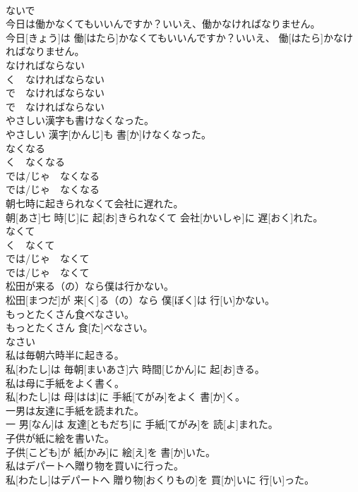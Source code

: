 \documentclass[8pt]{extreport}
\begin{document}
\begin{CJK}{UTF8}{min}
\\	ないで	
\\	今日は働かなくてもいいんですか？いいえ、働かなければなりません。	
\\	今日[きょう]は 働[はたら]かなくてもいいんですか？いいえ、 働[はたら]かなければなりません。	
\\	なければならない 
\\	く　なければならない 
\\	で　なければならない 
\\	で　なければならない	
\\	やさしい漢字も書けなくなった。	
\\	やさしい 漢字[かんじ]も 書[か]けなくなった。	
\\	なくなる 
\\	く　なくなる 
\\	では/じゃ　なくなる 
\\	では/じゃ　なくなる	
\\	朝七時に起きられなくて会社に遅れた。	
\\	朝[あさ]七 時[じ]に 起[お]きられなくて 会社[かいしゃ]に 遅[おく]れた。	
\\	なくて 
\\	く　なくて 
\\	では/じゃ　なくて 
\\	では/じゃ　なくて	
\\	松田が来る（の）なら僕は行かない。	
\\	松田[まつだ]が 来[く]る（の）なら 僕[ぼく]は 行[い]かない。	
\\	もっとたくさん食べなさい。	
\\	もっとたくさん 食[た]べなさい。	
\\	なさい	
\\	私は毎朝六時半に起きる。	
\\	私[わたし]は 毎朝[まいあさ]六 時間[じかん]に 起[お]きる。	
\\	私は母に手紙をよく書く。	
\\	私[わたし]は 母[はは]に 手紙[てがみ]をよく 書[か]く。	
\\	一男は友達に手紙を読まれた。	
\\	一 男[なん]は 友達[ともだち]に 手紙[てがみ]を 読[よ]まれた。	
\\	子供が紙に絵を書いた。	
\\	子供[こども]が 紙[かみ]に 絵[え]を 書[か]いた。	
\\	私はデパートへ贈り物を買いに行った。	
\\	私[わたし]はデパートへ 贈り物[おくりもの]を 買[か]いに 行[い]った。	

\end{CJK}
\end{document}
